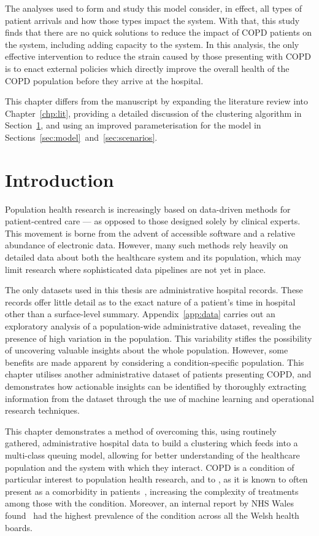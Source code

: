 The analyses used to form and study this model consider, in effect, all types of
patient arrivals and how those types impact the system. With that, this study
finds that there are no quick solutions to reduce the impact of COPD patients on
the system, including adding capacity to the system. In this analysis, the only
effective intervention to reduce the strain caused by those presenting with COPD
is to enact external policies which directly improve the overall health of the
COPD population before they arrive at the hospital.

\myrule%

This chapter differs from the manuscript by expanding the literature review into
Chapter~\ref{chp:lit}, providing a detailed discussion of the clustering
algorithm in Section~\ref{sec:copd:intro}, and using an improved
parameterisation for the model in
Sections~\ref{sec:model}~and~\ref{sec:scenarios}.

\section{Introduction}\label{sec:copd:intro}

Population health research is increasingly based on data-driven methods for
patient-centred care --- as opposed to those designed solely by clinical
experts. This movement is borne from the advent of accessible software and a
relative abundance of electronic data. However, many such methods rely heavily
on detailed data about both the healthcare system and its population, which may
limit research where sophisticated data pipelines are not yet in place.

The only datasets used in this thesis are administrative hospital records. These
records offer little detail as to the exact nature of a patient's time in
hospital other than a surface-level summary. Appendix~\ref{app:data} carries out
an exploratory analysis of a population-wide administrative dataset, revealing
the presence of high variation in the population. This variability stifles the
possibility of uncovering valuable insights about the whole population. However,
some benefits are made apparent by considering a condition-specific
population. This chapter utilises another administrative dataset of patients
presenting COPD, and demonstrates how actionable insights can be identified by
thoroughly extracting information from the dataset through the use of machine
learning and operational research techniques.

This chapter demonstrates a method of overcoming this, using routinely gathered,
administrative hospital data to build a clustering which feeds into a
multi-class queuing model, allowing for better understanding of the healthcare
population and the system with which they interact. COPD is a condition of
particular interest to population health research, and to \ctmuhb, as it is
known to often present as a comorbidity in patients~\cite{Houben2019},
increasing the complexity of treatments among those with the condition.
Moreover, an internal report by NHS Wales found \ctmuhb\ had the highest
prevalence of the condition across all the Welsh health boards.

